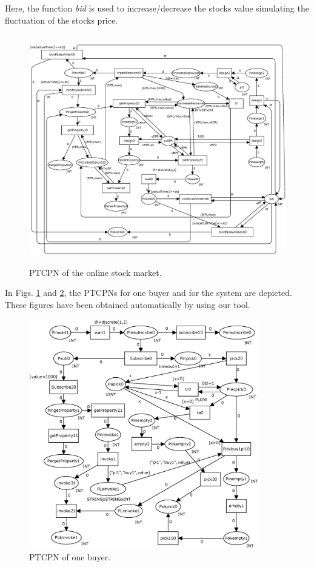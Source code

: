 Here, the function {\it bid} is used to increase/decrease the stocks value simulating the fluctuation of the stocks price.

\begin{figure}[h]
\includegraphics[width=\columnwidth, height=10cm]{Figures/sistema.eps}
\vspace{-0.6cm}
\caption{PTCPN of the online stock market.}\label{sistema}
\end{figure}
In Figs. \ref{sistema} and \ref{proceso}, the PTCPNs for one buyer and for the system are depicted.  These figures have been obtained automatically by using our tool. 
\begin{figure}[h]
\includegraphics[width=\columnwidth, height=10cm]{Figures/proceso.eps}
\vspace{-0.8cm}
\caption{PTCPN of one buyer.}\label{proceso}
\end{figure}

